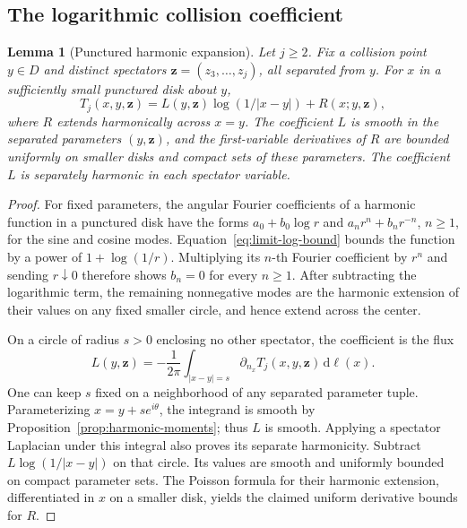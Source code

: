 \documentclass[11pt]{article}
\newcommand{\dd}{\,\mathrm d}
\newtheorem{lemma}[theorem]{Lemma}
\theoremstyle{definition}
\theoremstyle{remark}
\numberwithin{equation}{section}
\begin{document}
\subsection{The logarithmic collision coefficient}

\begin{lemma}[Punctured harmonic expansion]
\label{limit:puncture}
Let \(j\ge2\).  Fix a collision point \(y\in D\) and distinct spectators
\(\mathbf z=(z_3,\ldots,z_j)\), all separated from \(y\).
For \(x\) in a sufficiently small punctured disk about \(y\),
\begin{equation}
 T_j(x,y,\mathbf z)
      =L(y,\mathbf z)\log(1/|x-y|)
                           +R(x;y,\mathbf z),
 \label{eq:limit-puncture}
\end{equation}
where \(R\) extends harmonically across \(x=y\).
The coefficient \(L\) is smooth in the separated parameters
\((y,\mathbf z)\), and the first-variable derivatives of \(R\)
are bounded uniformly on smaller disks and compact sets of these
parameters.  The coefficient \(L\) is separately harmonic in each
spectator variable.
\end{lemma}

\begin{proof}
For fixed parameters, the angular Fourier coefficients of a harmonic
function in a punctured disk have the forms
\(a_0+b_0\log r\) and \(a_nr^n+b_nr^{-n}\), \(n\ge1\), for the
sine and cosine modes.  Equation~\eqref{eq:limit-log-bound} bounds
the function by a power of \(1+\log(1/r)\).  Multiplying its
\(n\)-th Fourier coefficient by \(r^n\) and sending \(r\downarrow0\)
therefore shows \(b_n=0\) for every \(n\ge1\).
After subtracting the logarithmic term, the remaining nonnegative
modes are the harmonic extension of their values on any fixed
smaller circle, and hence extend across the center.

On a circle of radius \(s>0\) enclosing no other spectator,
the coefficient is the flux
\begin{equation}
 L(y,\mathbf z)
   =-\frac1{2\pi}
       \int_{|x-y|=s}\partial_{n_x}T_j(x,y,\mathbf z)\dd\ell(x).
 \label{eq:limit-flux}
\end{equation}
One can keep \(s\) fixed on a neighborhood of any separated
parameter tuple.  Parameterizing \(x=y+se^{i\theta}\), the integrand
is smooth by Proposition~\ref{prop:harmonic-moments}; thus \(L\)
is smooth.  Applying a spectator Laplacian under this integral
also proves its separate harmonicity.
Subtract \(L\log(1/|x-y|)\) on that circle.  Its values are
smooth and uniformly bounded on compact parameter sets.
The Poisson formula for their harmonic extension, differentiated
in \(x\) on a smaller disk, yields the claimed uniform derivative
bounds for \(R\).
\end{proof}
\end{document}
